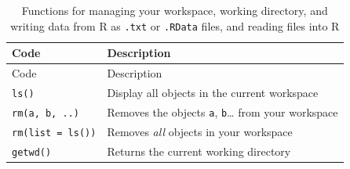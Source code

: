 \documentclass[]{book}
\theoremstyle{definition}
\theoremstyle{definition}
\theoremstyle{remark}
\begin{document}
\begin{longtable}[]{@{}ll@{}}
\caption{\label{tab:workspacefunctions} Functions for managing your
workspace, working directory, and writing data from R as \texttt{.txt}
or \texttt{.RData} files, and reading files into R}\tabularnewline
\toprule
\begin{minipage}[b]{0.34\columnwidth}\raggedright\strut
Code\strut
\end{minipage} & \begin{minipage}[b]{0.47\columnwidth}\raggedright\strut
Description\strut
\end{minipage}\tabularnewline
\midrule
\endfirsthead
\toprule
\begin{minipage}[b]{0.34\columnwidth}\raggedright\strut
Code\strut
\end{minipage} & \begin{minipage}[b]{0.47\columnwidth}\raggedright\strut
Description\strut
\end{minipage}\tabularnewline
\midrule
\endhead
\begin{minipage}[t]{0.34\columnwidth}\raggedright\strut
\texttt{ls()}\strut
\end{minipage} & \begin{minipage}[t]{0.47\columnwidth}\raggedright\strut
Display all objects in the current workspace\strut
\end{minipage}\tabularnewline
\begin{minipage}[t]{0.34\columnwidth}\raggedright\strut
\texttt{rm(a,\ b,\ ..)}\strut
\end{minipage} & \begin{minipage}[t]{0.47\columnwidth}\raggedright\strut
Removes the objects \texttt{a}, \texttt{b}\ldots{} from your
workspace\strut
\end{minipage}\tabularnewline
\begin{minipage}[t]{0.34\columnwidth}\raggedright\strut
\texttt{rm(list\ =\ ls())}\strut
\end{minipage} & \begin{minipage}[t]{0.47\columnwidth}\raggedright\strut
Removes \emph{all} objects in your workspace\strut
\end{minipage}\tabularnewline
\begin{minipage}[t]{0.34\columnwidth}\raggedright\strut
\texttt{getwd()}\strut
\end{minipage} & \begin{minipage}[t]{0.47\columnwidth}\raggedright\strut
Returns the current working directory\strut
\end{minipage}\tabularnewline

\end{longtable}
\end{document}
